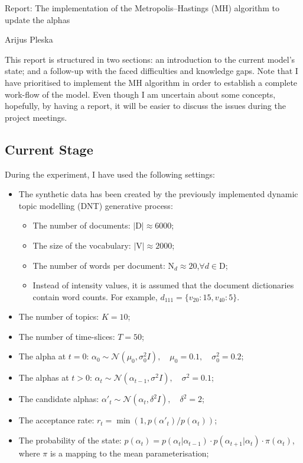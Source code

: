 \documentclass[12pt]{article}
\begin{document}
\begingroup  
  \centering
  \large Report: The implementation of the Metropolis--Hastings (MH) algorithm to update the alphas \par
  \large Arijus Pleska \par
\endgroup

\par This report is structured in two sections: an introduction to the current model's state; and a follow-up with the faced difficulties and knowledge gaps. Note that I have prioritised to implement the MH algorithm in order to establish a complete work-flow of the model. Even though I am uncertain about some concepts, hopefully, by having a report, it will be easier to discuss the issues during the project meetings.

\subsection*{Current Stage}


\par During the experiment, I have used the following settings:
\begin{itemize}
\item The synthetic data has been created by the previously implemented dynamic topic modelling (DNT) generative process:
\begin{itemize}
\item The number of documents: $|\mbox{D}|\approx6000$;
\item The size of the vocabulary: $|\mbox{V}|\approx2000$;
\item The number of words per document: $\mbox{N}_d\approx20$,\quad$\forall d \in \mbox{D}$;
\item Instead of intensity values, it is assumed that the document dictionaries contain word counts. For example, $d_{111}=\{v_{20}:15, v_{40}:5\}$. 
\end{itemize}
\item The number of topics: $K=10$;
\item The number of time-slices: $T=50$;
\item The alpha at $t=0$: $\alpha_0 \sim \mathcal{N}(\mu_0, \sigma^2_0I),\quad \mu_0 = 0.1,\quad\sigma_0^2 = 0.2$;
\item The alphas at $t>0$: $\alpha_t \sim \mathcal{N}(\alpha_{t-1}, \sigma^2I), \quad\sigma^2 = 0.1$;
\item The candidate alphas: $\alpha'_t \sim \mathcal{N}(\alpha_{t}, \delta^2I), \quad\delta^2 = 2$; 
\item The acceptance rate: $r_t=\min(1,p(\alpha'_t)/p(\alpha_t))$;
\item The probability of the state: $p(\alpha_t)=p(\alpha_{t} | \alpha_{t-1})\cdot p(\alpha_{t+1} | \alpha_{t})\cdot \pi(\alpha_t)$, where $\pi$ is a mapping to the mean parameterisation;
\end{itemize}
\end{document}
